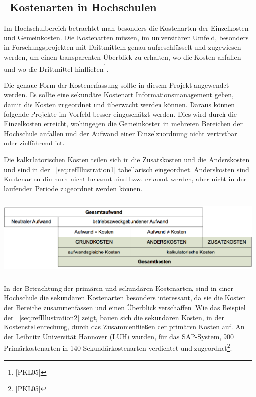 \documentclass[a4paper]{article}
\makeatletter
\newcommand\captionof[1]{\def\@captype{#1}\caption}
\makeatother
\begin{document}
\subsection[\ Kostenarten in Hochschulen]{\ Kostenarten in Hochschulen}
{\sffamily
Im Hochschulbereich betrachtet man besonders die Kostenarten der Einzelkosten und Gemeinkosten. Die Kostenarten müssen,
im universitären Umfeld, besonders in Forschungsprojekten mit Drittmitteln genau aufgeschlüsselt und zugewiesen werden,
um einen transparenten Überblick zu erhalten, wo die Kosten anfallen und wo die Drittmittel
hinfließen\footnote{[PKL05]}.}


\bigskip

{\sffamily
Die genaue Form der Kostenerfassung sollte in diesem Projekt angewendet werden. Es sollte eine sekundäre Kostenart
Informationsmanagement geben, damit die Kosten zugeordnet und überwacht werden können. Daraus können folgende Projekte
im Vorfeld besser eingeschätzt werden. Dies wird durch die Einzelkosten erreicht, wohingegen die Gemeinkosten in
mehreren Bereichen der Hochschule anfallen und der Aufwand einer Einzelzuordnung nicht vertretbar oder zielführend
ist.}


\bigskip

{\sffamily
Die kalkulatorischen Kosten teilen sich in die Zusatzkosten und die Anderskosten und sind in der
\figurename~\ref{seq:refIllustration1} tabellarisch eingeordnet. Anderskosten sind Kostenarten die noch nicht benannt
sind bzw. erkannt werden, aber nicht in der laufenden Periode zugeordnet werden können. }

{\centering \includegraphics[width=15.455cm,height=3.963cm]{INMAusarbeitung02-img002.png}
\captionof{figure}[Abgrenzung Aufwand {}- Kosten (Handbuch Kostenartenrechnung 05)]{Abgrenzung Aufwand -
Kosten\textcolor[rgb]{1.0,0.2,0.2}{ (Handbuch Kostenartenrechnung 05}\textcolor{red}{)}}
\label{seq:refIllustration1}
\par}
{\sffamily
In der Betrachtung der primären und sekundären Kostenarten, sind in einer Hochschule die sekundären Kostenarten
besonders interessant, da sie die Kosten der Bereiche zusammenfassen und einen Überblick verschaffen.\newline
Wie das Beispiel der \figurename~\ref{seq:refIllustration2} zeigt, bauen sich die sekundären Kosten, in der
Kostenstellenrechung, durch das Zusammenfließen der primären Kosten auf. An der Leibnitz Universität Hannover (LUH)
wurden, für das SAP-System, 900 Primärkostenarten in 140 Sekundärkostenarten verdichtet und
zugeordnet\footnote{[PKL05]}.}
\end{document}
